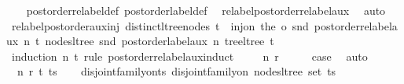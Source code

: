 \begin{isabellebody}
%
\isadelimproof
\ \ %
\endisadelimproof
%
\isatagproof
{}\isamarkupfalse%
\ postorder{\isacharunderscore}{\kern0pt}relabel{\isacharunderscore}{\kern0pt}def\ postorder{\isacharunderscore}{\kern0pt}label{\isacharunderscore}{\kern0pt}def\ \isamarkupfalse%
\ relabel{\isacharunderscore}{\kern0pt}postorder{\isacharunderscore}{\kern0pt}relabel{\isacharunderscore}{\kern0pt}aux\ \isamarkupfalse%
\ auto%
\endisatagproof
{\isafoldproof}%
%
\isadelimproof
\isanewline
%
\endisadelimproof
\isanewline
{}\isamarkupfalse%
\ relabel{\isacharunderscore}{\kern0pt}postorder{\isacharunderscore}{\kern0pt}aux{\isacharunderscore}{\kern0pt}inj{\isacharcolon}{\kern0pt}\ {\isachardoublequoteopen}distinct{\isacharunderscore}{\kern0pt}ltree{\isacharunderscore}{\kern0pt}nodes\ t\ {\isasymLongrightarrow}\ inj{\isacharunderscore}{\kern0pt}on\ {\isacharparenleft}{\kern0pt}the\ o\ snd\ {\isacharparenleft}{\kern0pt}postorder{\isacharunderscore}{\kern0pt}relabel{\isacharunderscore}{\kern0pt}aux\ n\ t{\isacharparenright}{\kern0pt}{\isacharparenright}{\kern0pt}\ {\isacharparenleft}{\kern0pt}nodes{\isacharunderscore}{\kern0pt}ltree\ {\isacharparenleft}{\kern0pt}snd\ {\isacharparenleft}{\kern0pt}postorder{\isacharunderscore}{\kern0pt}label{\isacharunderscore}{\kern0pt}aux\ n\ {\isacharparenleft}{\kern0pt}tree{\isacharunderscore}{\kern0pt}ltree\ t{\isacharparenright}{\kern0pt}{\isacharparenright}{\kern0pt}{\isacharparenright}{\kern0pt}{\isacharparenright}{\kern0pt}{\isachardoublequoteclose}\isanewline
%
\isadelimproof
%
\endisadelimproof
%
\isatagproof
{}\isamarkupfalse%
\ {\isacharparenleft}{\kern0pt}induction\ n\ t\ rule{\isacharcolon}{\kern0pt}\ postorder{\isacharunderscore}{\kern0pt}relabel{\isacharunderscore}{\kern0pt}aux{\isachardot}{\kern0pt}induct{\isacharparenright}{\kern0pt}\isanewline
\ \ \isamarkupfalse%
\ {\isacharparenleft}{\kern0pt}{}\ n\ r{\isacharparenright}{\kern0pt}\isanewline
\ \ \isamarkupfalse%
\ \isamarkupfalse%
\ {\isacharquery}{\kern0pt}case\ \isamarkupfalse%
\ auto\isanewline
{}\isamarkupfalse%
\isanewline
\ \ \isamarkupfalse%
\ {\isacharparenleft}{\kern0pt}{}\ n\ r\ t\ ts{\isacharparenright}{\kern0pt}\isanewline
\ \ \isamarkupfalse%
\ disjoint{\isacharunderscore}{\kern0pt}family{\isacharunderscore}{\kern0pt}on{\isacharunderscore}{\kern0pt}ts{\isacharcolon}{\kern0pt}\ {\isachardoublequoteopen}disjoint{\isacharunderscore}{\kern0pt}family{\isacharunderscore}{\kern0pt}on\ nodes{\isacharunderscore}{\kern0pt}ltree\ {\isacharparenleft}{\kern0pt}set\ ts{\isacharparenright}{\kern0pt}{\isachardoublequoteclose}\ \isamarkupfalse%

\end{isabellebody}
